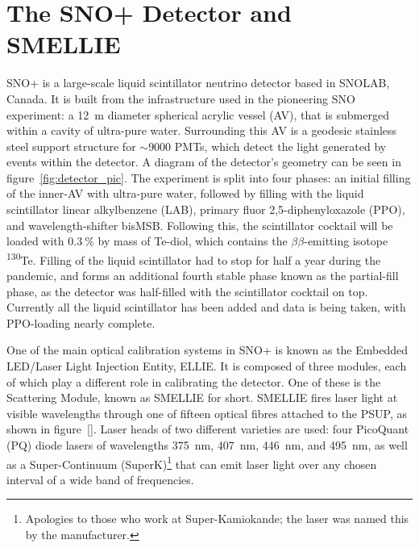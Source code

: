 \section{The SNO+ Detector and SMELLIE}\label{sect:detector}
SNO+ is a large-scale liquid scintillator neutrino detector based in SNOLAB, Canada. It is built from the infrastructure used in the pioneering SNO experiment: a \SI{12}{\metre} diameter spherical acrylic vessel (AV), that is submerged within a cavity of ultra-pure water. Surrounding this AV is a geodesic stainless steel support structure for $\sim\num{9000}$ PMTs, which detect the light generated by events within the detector. A diagram of the detector's geometry can be seen in figure~\ref{fig:detector_pic}. The experiment is split into four phases: an initial filling of the inner-AV with ultra-pure water, followed by filling with the liquid scintillator linear alkylbenzene (LAB), primary fluor 2,5-diphenyloxazole (PPO), and wavelength-shifter bisMSB. Following this, the scintillator cocktail will be loaded with $\SI{0.3}{\percent}$ by mass of Te-diol, which contains the $\beta\beta$-emitting isotope \textsuperscript{130}Te. Filling of the liquid scintillator had to stop for half a year during the pandemic, and forms an additional fourth stable phase known as the partial-fill phase, as the detector was half-filled with the scintillator cocktail on top. Currently all the liquid scintillator has been added and data is being taken, with PPO-loading nearly complete.

One of the main optical calibration systems in SNO+ is known as the Embedded LED/Laser Light Injection Entity, ELLIE. It is composed of three modules, each of which play a different role in calibrating the detector. One of these is the Scattering Module, known as SMELLIE for short. SMELLIE fires laser light at visible wavelengths through one of fifteen optical fibres attached to the PSUP, as shown in figure~\ref{}. Laser heads of two different varieties are used: four PicoQuant (PQ) diode lasers of wavelengths \SI{375}{\nano\metre}, \SI{407}{\nano\metre}, \SI{446}{\nano\metre}, and \SI{495}{\nano\metre}, as well as a Super-Continuum (SuperK)\footnote{Apologies to those who work at Super-Kamiokande; the laser was named this by the manufacturer.} that can emit laser light over any chosen interval of a wide band of frequencies.

